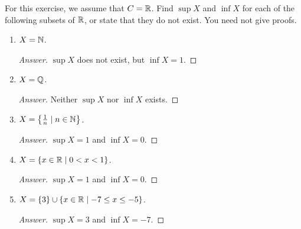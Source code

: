 \documentclass[../main.tex]{subfiles}
\begin{document}
\begin{exercise}\label{exr:5.10}
    For this exercise, we assume that $C=\mathbb{R}$. Find $\sup X$ and $\inf X$ for each of the following subsets of $\mathbb{R}$, or state that they do not exist. You need not give proofs.
    \begin{enumerate}
        \item $X=\mathbb{N}$.
        \begin{proof}[Answer]
            $\sup X$ does not exist, but $\inf X=1$.
        \end{proof}
        \item $X=\mathbb{Q}$.
        \begin{proof}[Answer]
            Neither $\sup X$ nor $\inf X$ exists.
        \end{proof}
        \item $X=\left\{ \frac{1}{n}\mid n\in\mathbb{N} \right\}$.
        \begin{proof}[Answer]
            $\sup X=1$ and $\inf X=0$.
        \end{proof}
        \item $X=\{x\in\mathbb{R}\mid 0<x<1\}$.
        \begin{proof}[Answer]
            $\sup X=1$ and $\inf X=0$.
        \end{proof}
        \item $X=\{3\}\cup\{x\in\mathbb{R}\mid-7\leq x\leq -5\}$.
        \begin{proof}[Answer]
            $\sup X=3$ and $\inf X=-7$.
        \end{proof}
    \end{enumerate}
\end{exercise}
\end{document}
